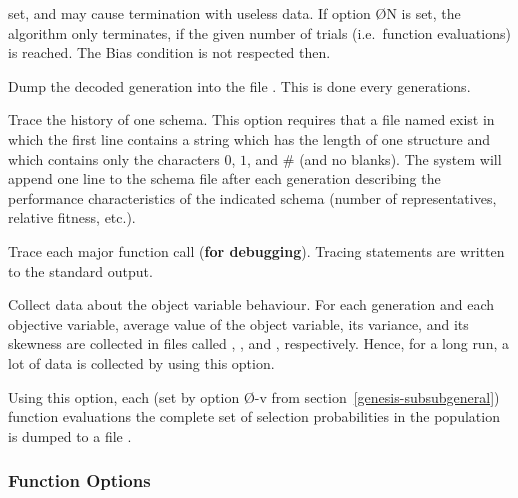 \begin{Enumerate}
	set, and may cause termination with useless data. 
	If option \O{N} is set, the algorithm only terminates, 
	if the given number of trials (i.e.~function evaluations) is reached. 
	The Bias condition is not respected then.
%
\item	{}
	Dump the decoded generation into the file .
	This is done every  generations.
%
\item	{}
	Trace the history of  one  schema.   
	This  option requires that a file named  exist in 
	which the first line contains a string which has the length of 
	one structure and  which  contains  only  the characters 
	$0$, $1$, and $\#$ (and no blanks).  
	The system will append  one  line  to  the
       	schema file after each generation describing the performance
       	characteristics  of  the   indicated   schema   (number   of
       	representatives, relative fitness, etc.).
%
\item	{}
	Trace each major function call  ({\bf for debugging}).
       	Tracing statements are written to the standard output.
%
\item	{}
	Collect data about the object variable behaviour.
	For each generation and each objective variable, 
	average value of the object variable, its variance, and its skewness
	are collected in files called , , 
	and , respectively.
	Hence, for a long run, a lot of data is collected by using
	this option.
%
\item	{}
	Using this option, each  (set by option \O{-v}
	from section~\ref{genesis-subsubgeneral}) function evaluations the
	complete set of selection probabilities in the population is
	dumped to a file .
%
\end{Enumerate} 

\subsubsection{Function Options}\label{genesis-subsubfunction}

